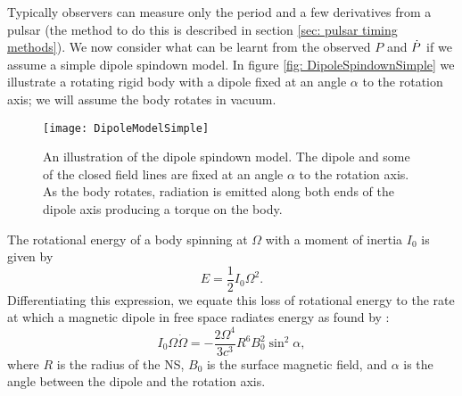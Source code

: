 Typically observers can measure only the period and a few derivatives from a
pulsar (the method to do this is described in section \ref{sec: pulsar timing
methods}).  We now consider what can be learnt from the observed $P$ and
$\dot{P}$ if we assume a simple dipole spindown model. In figure \ref{fig:
DipoleSpindownSimple} we illustrate a rotating rigid body with a dipole fixed
at an angle $\alpha$ to the rotation axis; we will assume the body rotates in
vacuum. 

\begin{figure}[htb]
    \centering
    \texttt{[image: DipoleModelSimple]}
    \caption{An illustration of the dipole spindown model. The dipole and some 
    of the closed field lines are fixed at an angle $\alpha$ to the rotation 
    axis. As the body rotates, radiation is emitted along both ends of the dipole
    axis producing a torque on the body.}
    \label{fig: DipoleSpindownSimple}
\end{figure}

The rotational energy of a body spinning at $\Omega$ with a moment of inertia
$I_{0}$ is given by
\begin{equation}
    E = \frac{1}{2}I_{0}\Omega^{2}.
\end{equation}
Differentiating this expression, we equate this loss of rotational energy
to the rate at which a magnetic dipole in free space radiates energy as found
by \citet{Pacini1967}:
\begin{equation}
    I_{0}\Omega\dot{\Omega} = 
                    -\frac{2\Omega^{4}}{3 c^{3}} R^{6} B_{0}^{2}\sin^{2}\alpha,
    \label{eqn: equate dKE to dEM} 
\end{equation}
where $R$ is the radius of the NS, $B_{0}$ is the surface magnetic field, and
$\alpha$ is the angle between the dipole and the rotation axis.  


